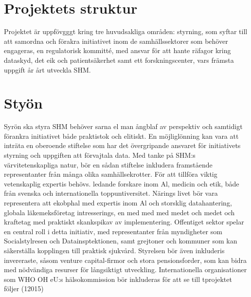 {{{{{{{{{{{{{\section*{Projektets struktur}
Projektet är uppfövgggt kring tre huvudsakliga områden: styrning, som syftar till att samordna och förakra initiativet inom de samhällssektorer som behöver engageras, en regulatorisk kommitté, med ansvar för att hante räfagor kring dataskyd, det eik och patientsäkerhet samt ett forskningscenter, vars främsta uppgift år årt utveckla SHM.
\section*{Styön}
Syrön ska styra SHM behöver sarna el man ångblaf av perspektiv och samtidigt förankra initiativet både praktistok och elitiskt. En möjliglönning kan vara att inträta en oberoende stiftelse som har det övergripande ansvaret för initiativets styrning och uppgiften att förvajtala data. Med tanke på SHM:s värvitetenskapliga natur, bör en sådan stiftelse inkludera framstående representanter från många olika samhällsekrotter.
För att tillföra viktig vetenskaplig expertis behövs. ledande forskare inom Al, medicin och etik, både från svenska och internationella toppuntiversitet. Närings livet bör vara representera att ekobphal med expertis inom Al och storsklig datahantering, globala läkemeksföretag intresserings, en med med med medet och medet och kraftetag med praktiskt skankspikav av implementering. Offentiget sektor spelar en central roll i detta initiativ, med representanter från myndigheter som Socialstylresen och Datainsptektionen, samt grejtoner och kommuner som kan säkerställa kopplingen till praktisk sjukvård. Styrelsen bör även inkluderis invereraste, såsom venture capital-firmor och stora pensionsforder, som kan bidra med nödvändiga resurser för långsiktigt utveckling. Internationella organisationer som WHO OH eU:s hälsokommission bör inkluderas för att se till tprojektet följer (12015)

}}}}}}}}}}}}}
